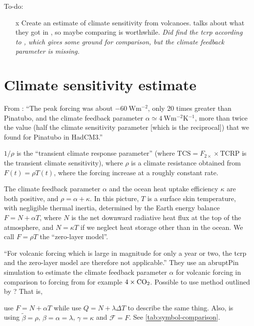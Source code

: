 \documentclass{ametsocV5}
\begin{document}
To-do:

\begin{itemize}
  \item[\lbrack{}x\rbrack{}] Create an estimate of climate sensitivity from volcanoes.
    \citet{gregory2016} talks about what they got in \citet{jones2005}, so maybe comparing
    is worthwhile. \emph{Did find the \ac{tcrp} according to \citet{merlis2014}, which gives
      some ground for comparison, but the climate feedback parameter is missing.}
\end{itemize}

\section*{Climate sensitivity estimate}

From \citet{gregory2016}: ``The peak forcing was about \(\SI{-60}{\watt\metre^{-2}}\),
only \(20\) times greater than Pinatubo, and the climate feedback parameter \(\alpha
\simeq \SI{4}{\watt\metre^{-2}\kelvin^{-1}}\), more than twice the value (half the
climate sensitivity parameter [which is the reciprocal]) that we found for Pinatubo in
HadCM3.''

\(1/\rho \) is the ``transient climate response parameter'' (where
\(\mathrm{TCS}=F_{2\times}\times \mathrm{TCRP}\) is the transient climate sensitivity),
where \(\rho \) is a climate resistance obtained from \(F(t)=\rho T(t)\), where the
forcing increase at a roughly constant rate.

The climate feedback parameter \(\alpha\) and the ocean heat uptake efficiency
\(\kappa\) are both positive, and \(\rho =\alpha +\kappa \). In this picture, \(T\) is a
surface skin temperature, with negligible thermal inertia, determined by the Earth
energy balance \(F=N+\alpha T\), where \(N\) is the net downward radiative heat flux at
the top of the atmosphere, and \(N=\kappa T\) if we neglect heat storage other than in
the ocean. We call \(F=\rho T\) the ``zero-layer model''.

``For volcanic forcing which is large in magnitude for only a year or two, the
\ac{tcrp} and the zero-layer model are therefore not applicable.'' They
\citep{gregory2016} use an abruptPin simulation to estimate the climate feedback
parameter \(\alpha \) for volcanic forcing in comparison to forcing from for example
\(4\times \ce{CO2}\). Possible to use method outlined by \citet{merlis2014}? That is,

\citet{gregory2016} use \(F=N+\alpha T\) while \citet{jones2005} use \(Q=N+\lambda
\Delta T\) to describe the same thing. Also, \citet{merlis2014} is using
\(\tilde{\beta}=\rho\), \(\beta =\alpha =\lambda \), \(\gamma =\kappa \) and
\(\mathcal{F}=F\). See \cref{tab:symbol-comparison}.
\end{document}
